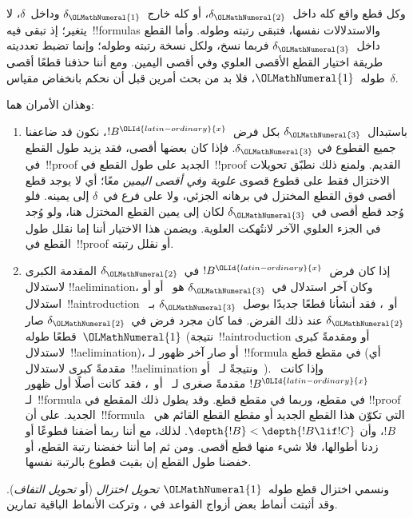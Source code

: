 \documentclass[../../../include/open-logic-section]{subfiles}
\begin{document}
وكل قطع واقع كله داخل~$\delta_{\OLMathNumeral{2}}$، أو كله خارج~$\delta_{\OLMathNumeral{1}}$ وداخل~$\delta$،
لا يتغير؛ إذ تبقى فيه~!!{formula}s والاستدلالات نفسها، فتبقى رتبته وطوله.
وأما القطع داخل~$\delta_{\OLMathNumeral{3}}$ فربما نسخ، ولكل نسخة رتبته وطوله؛ وإنما تضبط
تعدديته طريقة اختيار القطع الأقصى العلوي وفي أقصى اليمين. ومع أننا حذفنا
قطعًا أقصى طوله~${\OLMathNumeral{1}}$، فلا بد من بحث أمرين قبل أن نحكم بانخفاض مقياس~$\delta$.

وهذان الأمران هما:
\begin{enumerate}
  \item باستبدال~$\delta_{\OLMathNumeral{3}}$ بكل فرض~$!B^{\OLId{latin-ordinary}{x}}$، نكون قد ضاعفنا جميع القطوع في
  $\delta_{\OLMathNumeral{3}}$. فإذا كان بعضها أقصى، فقد يزيد طول القطع في~!!{proof} الجديد
  على طول القطع في~!!{proof} القديم. ولمنع ذلك نطبّق تحويلات الاختزال فقط
  على قطوع قصوى \emph{علوية وفي أقصى اليمين} معًا؛ أي لا يوجد قطع أقصى فوق
  القطع المختزل في برهانه الجزئي، ولا على فرع في~$\delta$ إلى يمينه. فلو
  وُجد قطع أقصى في~$\delta_{\OLMathNumeral{3}}$ لكان إلى يمين القطع المختزل هنا، ولو وُجد في
  الجزء العلوي الآخر لانتُهكت العلوية. ويضمن هذا الاختيار أننا إما نقلل طول
  القطع في~!!{proof} أو نقلل رتبته.
  \item إذا كان فرض~$!B^{\OLId{latin-ordinary}{x}}$ في~$\delta_{\OLMathNumeral{2}}$ المقدمة الكبرى لاستدلال
  !!a{elimination}، وكان آخر استدلال في~$\delta_{\OLMathNumeral{3}}$ هو~\Elim{\lor} أو
  \Elim{\lexists} أو استدلال~!!a{introduction} أو~\FalseInt، فقد أنشأنا
  قطعًا جديدًا بوصل~$\delta_{\OLMathNumeral{3}}$ بـ~$\delta_{\OLMathNumeral{2}}$ عند ذلك الفرض. فما كان مجرد
  فرض في~$\delta_{\OLMathNumeral{2}}$ صار قطعًا طوله~${\OLMathNumeral{1}}$ (نتيجة~!!a{introduction} أو
  \FalseInt ومقدمةً كبرى لاستدلال~!!a{elimination})، أو صار آخر ظهور
  لـ~!!{formula} في مقطع قطع (أي مقدمةً كبرى لاستدلال~!!a{elimination}
  ونتيجةً لـ~\Elim{\lor} أو~\Elim{\lexists}). وإذا كانت~$!B^{\OLId{latin-ordinary}{x}}$ مقدمةً
  صغرى لـ~\Elim{\lor} أو~\Elim{\lexists}، فقد كانت أصلًا أول ظهور
  لـ~!!{formula} في مقطع، وربما في مقطع قطع. وقد يطول ذلك المقطع في
  !!{proof} الجديد. على أن~!!{formula} التي تكوّن هذا القطع الجديد أو
  مقطع القطع القائم هي~$!B$، وأن
  $\depth{!B} < \depth{!B \lif !C}$. لذلك، مع أننا ربما أضفنا قطوعًا أو
  زدنا أطوالها، فلا شيء منها قطع أقصى. ومن ثم إما أننا خفضنا رتبة القطع، أو
  خفضنا طول القطع إن بقيت قطوع بالرتبة نفسها.
\end{enumerate}

ونسمي اختزال قطع طوله~${\OLMathNumeral{1}}$ \emph{تحويل اختزال} (أو \emph{تحويل
التفاف}). وقد أثبتت أنماط بعض أزواج القواعد في
، وتركت الأنماط الباقية تمارين.
\end{document}
